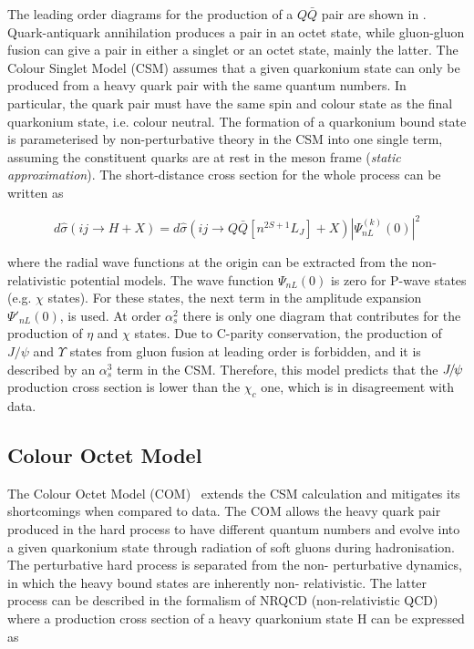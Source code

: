 The leading order diagrams for the production of a $Q\bar{Q}$ pair are shown in
. Quark-antiquark annihilation produces a pair in an octet
state, while gluon-gluon fusion can give a  pair in either a singlet or an
octet state, mainly the latter. The Colour Singlet Model (CSM)\cite{Humpert:171969}
assumes that a given quarkonium state can only be produced from a heavy quark
pair with the same quantum numbers. In particular, the quark pair must have
the same spin and colour state as the final quarkonium state, i.e. colour
neutral. The formation of a quarkonium bound state is parameterised by
non-perturbative theory in the CSM into one single term, assuming the constituent
quarks are at rest in the meson frame ({\it{static approximation}}). The 
short-distance cross section for the whole process can be written as

\begin{equation}
d{\hat{\sigma}}(ij\rightarrow H + X) = d{\hat{\sigma}}(ij\rightarrow Q{\bar{Q}}\left[n^{2S+1}L_J\right] + X) 
|\Psi^{(k)}_{nL}(0)|^2
\end{equation}

\noindent where the radial wave functions at the origin can be extracted from
the non-relativistic potential models. The wave function $\Psi_{nL}(0)$ is zero
for P-wave states (e.g. $\chi$ states). For these states, the next term in the
amplitude expansion $\Psi'_{nL}(0)$, is used. At order $\alpha_s^2$ there is
only one diagram that contributes for the production of $\eta$ and $\chi$
states. Due to C-parity conservation, the production of $J/\psi$ and $\Upsilon$
states from gluon fusion at leading order is forbidden, and it is described by
an $\alpha_s^3$ term in the CSM. Therefore, this model predicts that the
${{J\mskip -3mu/\mskip -2mu\psi\mskip 2mu}}$ production cross section is lower than the $\chi_c$ one, which is in
disagreement with data.

\subsection{Colour Octet Model}

The Colour Octet Model (COM)~\cite{Braaten:1993rw,Bodwin:1994jh} extends the CSM calculation and
mitigates its shortcomings when compared to data. The COM allows the heavy
quark pair produced in the hard process to have different quantum numbers and
evolve into a given quarkonium state through radiation of soft gluons during
hadronisation. The perturbative hard process is separated from the non-
perturbative dynamics, in which the heavy bound states are inherently non-
relativistic. The latter process can be described in the formalism of NRQCD
(non-relativistic QCD) where a production cross section of a heavy quarkonium
state H can be expressed as

